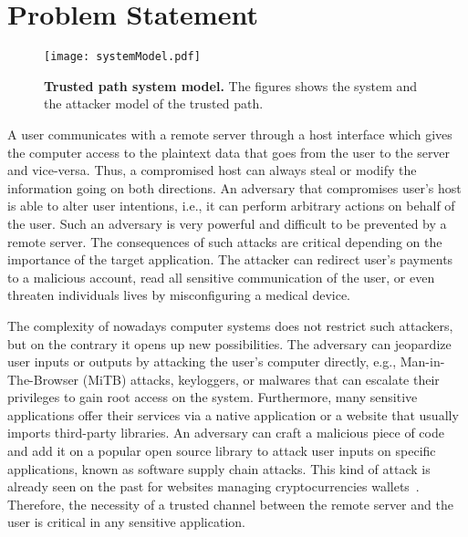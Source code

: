 \section{Problem Statement}
\label{sec:problemStatement}

\begin{figure}[t]
\centering
\texttt{[image: systemModel.pdf]}
\caption{\textbf{Trusted path system model.} The figures shows the system and the attacker model of the trusted path.}
\label{fig:systemModel}
\centering
\end{figure}


\iffalse
A user communicates with a remote server through a host interface which gives %
the computer access to the plaintext data that goes from the user to the server and vice-versa. Thus, a compromised host can always steal or modify the information going on both directions. An adversary that compromises user's host is able to alter user intentions, i.e., it can perform arbitrary actions on behalf of the user. Such an adversary is very powerful and difficult to be prevented by a remote server. The consequences of such attacks are critical depending on the importance of the target application. The attacker can redirect user's payments to a malicious account, read all sensitive communication of the user, or even threaten individuals lives by misconfiguring a medical device. 

The complexity of nowadays computer systems does not restrict such attackers, but on the contrary it opens up new possibilities. The adversary can jeopardize user inputs or outputs by attacking the user's computer directly, e.g., Man-in-The-Browser (MiTB) attacks, keyloggers, or malwares that can escalate their privileges to gain root access on the system. Furthermore, many sensitive applications offer their services via a native application or a website that usually imports third-party libraries. An adversary can craft a malicious piece of code and add it on a popular open source library to attack user inputs on specific applications, known as software supply chain attacks. This kind of attack is already seen on the past for websites managing cryptocurrencies wallets~\cite{softSupplyChainAttack, jsSupplyChainAttack}. Therefore, the necessity of a trusted channel between the remote server and the user is critical in any sensitive application.

